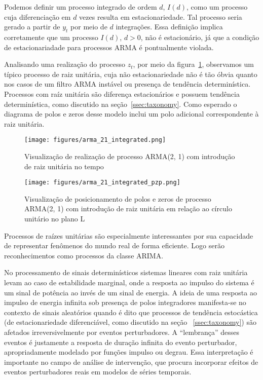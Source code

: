 Podemos definir um processo integrado de ordem $d$, $I(d)$, como um processo
cuja diferenciação em $d$ vezes resulta em estacionariedade. Tal processo seria
gerado a partir de $y_t$ por meio de $d$ integrações. Essa definição implica
corretamente que um processo $I(d)$, $d > 0$, não é estacionário, já que a
condição de estacionariadade para processos ARMA é pontualmente violada.

Analisando uma realização do processo $z_t$, por meio da
figura~\ref{fig:ARMA2-1-integrated}, observamos um típico processo de raiz
unitária, cuja não estacionariedade não é tão óbvia quanto nos casos de um
filtro ARMA instável ou presença de tendência determinística. Processos com
raíz unitária são diferença estacionários e possuem tendência determinística,
como discutido na seção~\ref{ssec:taxonomy}. Como esperado o diagrama de
polos e zeros desse modelo inclui um polo adicional correspondente à raiz
unitária.

\begin{figure}[H]
    \centering
    \texttt{[image: figures/arma\_21\_integrated.png]}
    \caption{Visualização de realização de processo ARMA(2, 1) com introdução
    de raiz unitária no tempo}
    \label{fig:ARMA2-1-integrated}
\end{figure}

\begin{figure}[H]
    \centering
    \texttt{[image: figures/arma\_21\_integrated\_pzp.png]}
    \caption{Visualização de posicionamento de polos e zeros de processo
    ARMA(2, 1) com introdução de raiz unitária em relação ao
    círculo unitário no plano L}
    \label{fig:ARMA2-1-integrated-pzp}
\end{figure}

Processos de raízes unitárias são especialmente interessantes por sua
capacidade de representar fenômenos do mundo real de forma eficiente. Logo
serão reconhecimentos como processos da classe ARIMA.

No processamento de sinais determinísticos sistemas lineares com raiz unitária
levam ao caso de estabilidade marginal, onde a resposta ao impulso do sistema é
um sinal de potência ao invés de um sinal de energia. A ideia de uma resposta
ao impulso de energia infinita sob presença de polos integradores manifesta-se
no contexto de sinais aleatórios quando é dito que processos de tendência
estocástica (de estacionariedade diferenciável, como discutido na seção
~\ref{ssec:taxonomy}) são afetados irreversivelmente por eventos perturbadores.
A ``lembrança'' desses eventos é justamente a resposta de duração infinita do
evento perturbador, apropriadamente modelado por funções impulso ou degrau.
Essa interpretação é importante no campo de análise de intervenção, que procura
incorporar efeitos de eventos perturbadores reais em modelos de séries
temporais.

